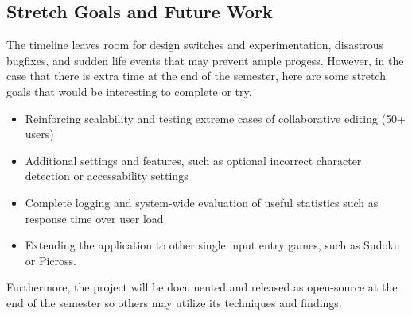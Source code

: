 \documentclass{article}
\begin{document}
\subsection{Stretch Goals and Future Work}
The timeline leaves room for design switches and experimentation, disastrous bugfixes, and sudden life events that
may prevent ample progess. However, in the case that there is extra time at the end of the semester, here are some stretch
goals that would be interesting to complete or try.
\begin{itemize}
    \item Reinforcing scalability and testing extreme cases of collaborative editing (50+ users)
    \item Additional settings and features, such as optional incorrect character detection or accessability settings
    \item Complete logging and system-wide evaluation of useful statistics such as response time over user load
    \item Extending the application to other single input entry games, such as Sudoku or Picross.
\end{itemize}

Furthermore, the project will be documented and released as open-source at the end of the semester so others may utilize its techniques and findings.

\newpage


\end{document}
